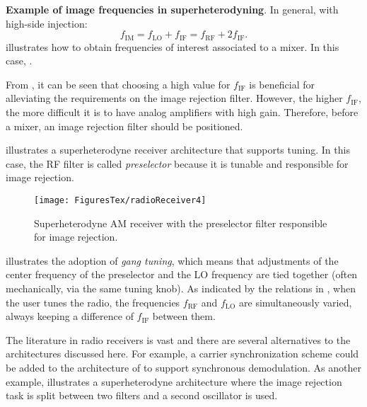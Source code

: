 \bExample \textbf{Example of image frequencies in superheterodyning}.
In general, with high-side injection:
\begin{equation}
f_{\textrm{IM}} = f_{\textrm{LO}}+f_{\textrm{IF}} = f_{\textrm{RF}} + 2 f_{\textrm{IF}}.
\end{equation}
 illustrates how to obtain frequencies of interest associated to a mixer. In this case, 
.


From , it can be seen that choosing a high value for $f_{\textrm{IF}}$ is beneficial for alleviating the requirements on the image rejection filter. However, the higher $f_{\textrm{IF}}$, the more difficult it is to have analog 
amplifiers with high gain.
Therefore, before a mixer, an image rejection filter should be positioned. 
\eExample 

illustrates a superheterodyne receiver architecture that supports tuning. In this case,
the RF filter is called \emph{preselector} because it is tunable and responsible for image rejection.

\begin{figure}[htbp]
	\centering
		\texttt{[image: FiguresTex/radioReceiver4]}		
	\caption{Superheterodyne AM receiver with the preselector filter responsible for image rejection.\label{fig:radioReceiver4}}
\end{figure}

 illustrates the adoption of
\emph{gang tuning}, which means that adjustments of 
the center frequency of the preselector and the LO frequency are tied together (often mechanically, via the same tuning knob). As indicated by the relations in , when the user tunes the radio, the frequencies $f_{\textrm{RF}}$ and $f_{\textrm{LO}}$ are simultaneously varied, always keeping a difference of $f_{\textrm{IF}}$ between them.

The literature in radio receivers is vast and there are several alternatives to the
architectures discussed here. For example, a carrier synchronization scheme could be added
to the architecture of   to support synchronous demodulation.
As another example,  illustrates a superheterodyne architecture where
the image rejection task is split between two filters and a second oscillator is used.


